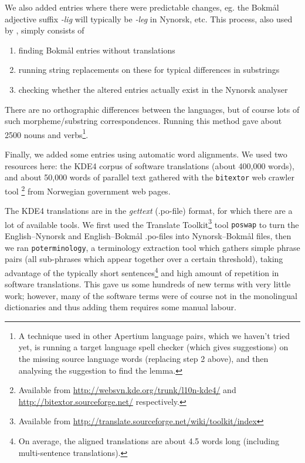 \documentclass[11pt]{article}
\begin{document}
We also added entries where there were predictable changes, eg. the
Bokmål adjective suffix \emph{-lig} will typically be \emph{-leg} in Nynorsk,
etc. This process, also used by \citet[p.~4]{tyers2009dpm},
simply consists of
\begin{enumerate}
\item finding Bokmål entries without translations
\item running string replacements on these for typical differences in
   substrings
\item checking whether the altered entries actually exist in the Nynorsk
   analyser
\end{enumerate}
There are no orthographic differences between the languages, but of
course lots of such morpheme/substring correspondences. Running
 this method gave about 2500 nouns and verbs\footnote{A technique
  used in other Apertium language pairs, which we haven't tried yet,
  is running a target language spell checker (which gives suggestions)
  on the missing source language words (replacing step 2 above), and
  then analysing the suggestion to find the lemma. }.

Finally, we added some entries using automatic word alignments. We
used two resources here: the KDE4 corpus of software translations
(about 400,000 words), and about 50,000 words of parallel text
gathered with the {\tt bitextor} web crawler tool
\citep{espla-gomis2009bfs}\footnote{Available
  from
  \href{http://websvn.kde.org/trunk/l10n-kde4/}{http://websvn.kde.org/trunk/l10n-kde4/}
  and
  \href{http://bitextor.sourceforge.net/}{http://bitextor.sourceforge.net/}
  respectively.} from Norwegian government web pages.

The KDE4 translations are in the \emph{gettext} (.po-file) format, for
which there are a lot of available tools. We first used the Translate
Toolkit\footnote{Available from
  \href{http://translate.sourceforge.net/wiki/toolkit/index}{http://translate.sourceforge.net/wiki/toolkit/index}
} tool {\tt poswap} to turn the English–Nynorsk and English–Bokmål
.po-files into Nynorsk–Bokmål files, then we ran
{\tt poterminology}, a terminology extraction tool which gathers
simple phrase pairs (all sub-phrases which appear together over a
certain threshold), taking advantage of the typically short
sentences\footnote{On average, the aligned translations are about 4.5
  words long (including multi-sentence translations).} and high amount
of repetition in software translations. This gave us some hundreds of
new terms with very little work; however, many of the software terms
were of course not in the monolingual dictionaries and thus adding
them requires some manual labour.
\end{document}
